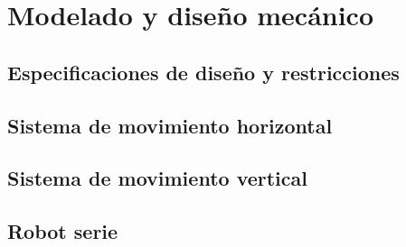 \documentclass[a4paper,12pt]{report}
\begin{document}
\section{Modelado y diseño mecánico}

\subsection{Especificaciones de diseño y restricciones}


%
%
%

%
\subsection{Sistema de movimiento horizontal}


%

\subsection{Sistema de movimiento vertical}


%

\subsection{Robot serie}

%



\end{document}
